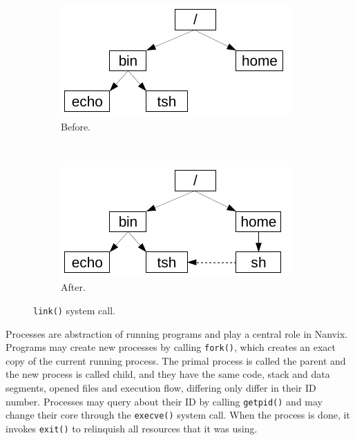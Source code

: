 \documentclass[10pt,a4paper]{article}
\begin{document}
\begin{figure}[b]
	\centering
	\begin{subfigure}[b]{0.35\linewidth}
		\includegraphics[width=\textwidth]{img/link-1}
		\caption{Before.}
	\end{subfigure} ~ 
	\begin{subfigure}[b]{0.35\linewidth}
		\includegraphics[width=\textwidth]{img/link-2}
		\caption{After.}
	\end{subfigure}
	\caption{\texttt{link()} system call.}
	\label{figure: link system call}
\end{figure}

Processes are abstraction of running programs and play a central role in Nanvix. Programs may create new processes by calling \texttt{fork()}, which creates an exact copy of the current running process. The primal process is called the parent and the new process is called child, and they have the same code, stack and data segments, opened files and execution flow, differing only differ in their ID number. Processes may query about their ID by calling \texttt{getpid()} and may change their core through the \texttt{execve()} system call. When the process is done, it invokes \texttt{exit()} to relinquish all resources that it was using.
\end{document}
